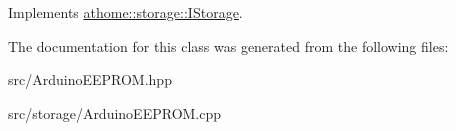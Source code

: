 Implements \mbox{\hyperlink{classathome_1_1storage_1_1_i_storage_a1017bb6ad438313b98197893954e52f1}{athome\+::storage\+::\+I\+Storage}}.



The documentation for this class was generated from the following files\+:\begin{DoxyCompactItemize}
\item 
src/Arduino\+E\+E\+P\+R\+O\+M.\+hpp\item 
src/storage/Arduino\+E\+E\+P\+R\+O\+M.\+cpp\end{DoxyCompactItemize}
